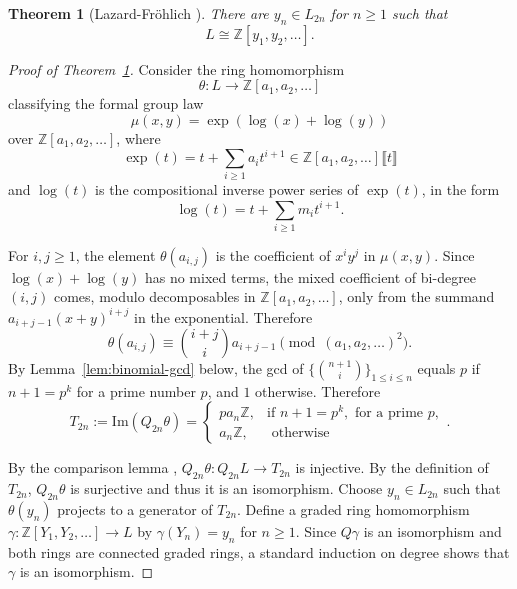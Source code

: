 \documentclass[a4paper]{amsart}
\theoremstyle{plain}
\newtheorem{theorem}[subsubsection]{Theorem}
\theoremstyle{definition}
\newcommand{\ZZ}{\mathbb{Z}}
\renewcommand{\le}{\leqslant}
\renewcommand{\ge}{\geqslant}
\begin{document}
\begin{theorem}[Lazard-Fr{\"o}hlich {\cite{lazard1955sur,frohlich1968formal}}]\label{thm:lazard-structure}
	There are $y_n\in L_{2n}$ for $n\ge 1$ such that
	\[
		L \cong \ZZ[y_{1}, y_{2}, \ldots].
	\]
\end{theorem}
\begin{proof}[Proof of Theorem~\ref{thm:lazard-structure}]
	Consider the ring homomorphism
	\[
		\theta: L \to \ZZ[a_1, a_2, \ldots]
	\]
	classifying the formal group law
	\[
		\mu(x,y) = \exp(\log(x) + \log(y))
	\]
	over $\ZZ[a_1, a_2, \ldots]$, where
	\begin{equation}\label{eq:exp-series}
		\exp(t) = t + \sum_{i\ge 1} a_i t^{i+1} \in \ZZ[a_{1}, a_{2}, \ldots] \llbracket t \rrbracket
	\end{equation}
	and $\log(t)$ is the compositional inverse power series of $\exp(t)$, in the form
	\begin{equation}\label{eq:log-series}
		\log(t) = t + \sum_{i\ge 1} m_i t^{i+1}.
	\end{equation}

	For $i,j\ge 1$, the element $\theta(a_{i,j})$ is the coefficient of $x^iy^j$ in $\mu(x,y)$. Since $\log(x)+\log(y)$ has no mixed terms, the mixed coefficient of bi-degree $(i,j)$ comes, modulo decomposables in $\ZZ[a_1,a_2,\ldots]$, only from the summand $a_{i+j-1}(x+y)^{i+j}$ in the exponential. Therefore
	\[
		\theta(a_{i,j}) \equiv \binom{i+j}{i} a_{i+j-1}
		\pmod{(a_1,a_2,\ldots)^2}.
	\]
	By Lemma~\ref{lem:binomial-gcd} below, the gcd of $\{\binom{n+1}{i}\}_{1\le i\le n}$ equals $p$ if $n+1=p^k$ for a prime number $p$, and $1$ otherwise. Therefore
	\[
		T_{2n} := \mathrm{Im}(Q_{2n} \theta) = \begin{cases}
			p a_n \ZZ, & \text{if }n+1=p^{k}, \text{ for a prime } p, \\
			a_n \ZZ,   & \text{ otherwise}
		\end{cases}.
	\]

	By the comparison lemma \cite[Lemma A2.1.12]{ravenel1986complex}, $Q_{2n} \theta:Q_{2n} L \to T_{2n}$ is injective. By the definition of $T_{2n}$, $Q_{2n} \theta$ is surjective and thus it is an isomorphism. Choose $y_{n} \in L_{2n}$ such that $\theta(y_{n})$ projects to a generator of $T_{2n}$. Define a graded ring homomorphism $\gamma: \ZZ[Y_1,Y_2,\ldots] \to L$ by $\gamma(Y_{n}) = y_{n}$ for $n\ge 1$. Since $Q\gamma$ is an isomorphism and both rings are connected graded rings, a standard induction on degree shows that $\gamma$ is an isomorphism.
\end{proof}
\end{document}
